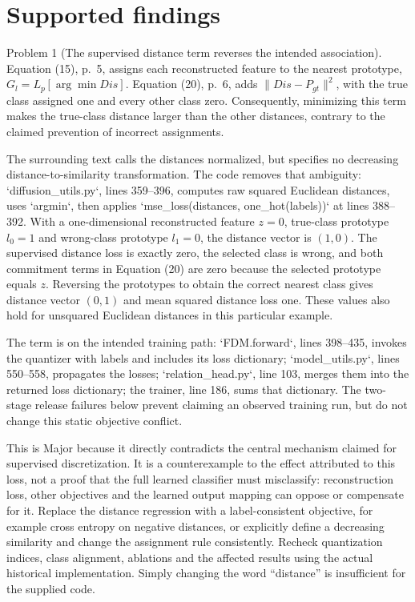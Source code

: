 \documentclass[10pt]{article}
\begin{document}
\section*{Supported findings}
Problem 1 (The supervised distance term reverses the intended association).  Equation (15), p. 5, assigns each reconstructed feature to the nearest prototype, \(G_l=L_p[\arg\min Dis]\). Equation (20), p. 6, adds \(\|Dis-P_{gt}\|^2\), with the true class assigned one and every other class zero. Consequently, minimizing this term makes the true-class distance larger than the other distances, contrary to the claimed prevention of incorrect assignments.\par
The surrounding text calls the distances normalized, but specifies no decreasing distance-to-similarity transformation. The code removes that ambiguity: `diffusion\_utils.py`, lines 359–396, computes raw squared Euclidean distances, uses `argmin`, then applies `mse\_loss(distances, one\_hot(labels))` at lines 388–392. With a one-dimensional reconstructed feature \(z=0\), true-class prototype \(l_0=1\) and wrong-class prototype \(l_1=0\), the distance vector is \((1,0)\). The supervised distance loss is exactly zero, the selected class is wrong, and both commitment terms in Equation (20) are zero because the selected prototype equals \(z\). Reversing the prototypes to obtain the correct nearest class gives distance vector \((0,1)\) and mean squared distance loss one. These values also hold for unsquared Euclidean distances in this particular example.\par
The term is on the intended training path: `FDM.forward`, lines 398–435, invokes the quantizer with labels and includes its loss dictionary; `model\_utils.py`, lines 550–558, propagates the losses; `relation\_head.py`, line 103, merges them into the returned loss dictionary; the trainer, line 186, sums that dictionary. The two-stage release failures below prevent claiming an observed training run, but do not change this static objective conflict.\par
This is Major because it directly contradicts the central mechanism claimed for supervised discretization. It is a counterexample to the effect attributed to this loss, not a proof that the full learned classifier must misclassify: reconstruction loss, other objectives and the learned output mapping can oppose or compensate for it. Replace the distance regression with a label-consistent objective, for example cross entropy on negative distances, or explicitly define a decreasing similarity and change the assignment rule consistently. Recheck quantization indices, class alignment, ablations and the affected results using the actual historical implementation. Simply changing the word “distance” is insufficient for the supplied code.\par
\end{document}
